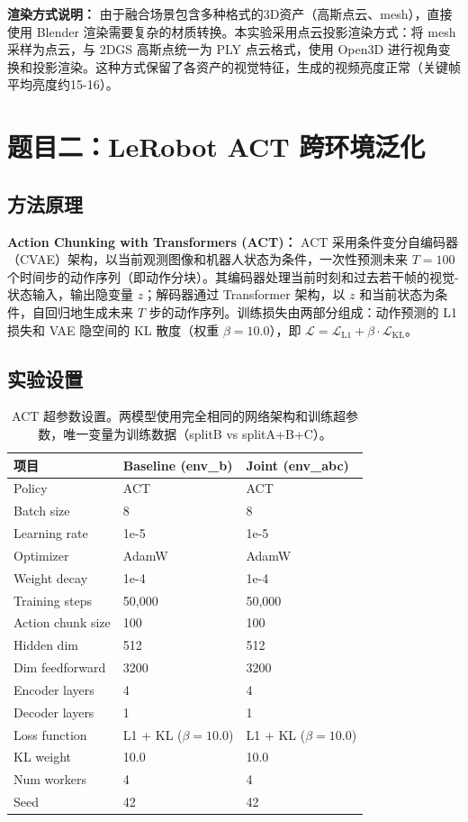 \documentclass[12pt,a4paper,fontset=fandol]{ctexart}
\begin{document}
\textbf{渲染方式说明：} 由于融合场景包含多种格式的3D资产（高斯点云、mesh），直接使用 Blender 渲染需要复杂的材质转换。本实验采用点云投影渲染方式：将 mesh 采样为点云，与 2DGS 高斯点统一为 PLY 点云格式，使用 Open3D 进行视角变换和投影渲染。这种方式保留了各资产的视觉特征，生成的视频亮度正常（关键帧平均亮度约15-16）。

\section{题目二：LeRobot ACT 跨环境泛化}
\subsection{方法原理}

\textbf{Action Chunking with Transformers (ACT)：} ACT 采用条件变分自编码器（CVAE）架构，以当前观测图像和机器人状态为条件，一次性预测未来 $T=100$ 个时间步的动作序列（即动作分块）。其编码器处理当前时刻和过去若干帧的视觉-状态输入，输出隐变量 $z$；解码器通过 Transformer 架构，以 $z$ 和当前状态为条件，自回归地生成未来 $T$ 步的动作序列。训练损失由两部分组成：动作预测的 L1 损失和 VAE 隐空间的 KL 散度（权重 $\beta=10.0$），即 $\mathcal{L} = \mathcal{L}_{\text{L1}} + \beta \cdot \mathcal{L}_{\text{KL}}$。

\subsection{实验设置}

\begin{table}[H]
\centering
\begin{tabular}{lll}
\toprule
项目 & Baseline (env\_b) & Joint (env\_abc) \\
\midrule
Policy & ACT & ACT \\
Batch size & 8 & 8 \\
Learning rate & 1e-5 & 1e-5 \\
Optimizer & AdamW & AdamW \\
Weight decay & 1e-4 & 1e-4 \\
Training steps & 50,000 & 50,000 \\
Action chunk size & 100 & 100 \\
Hidden dim & 512 & 512 \\
Dim feedforward & 3200 & 3200 \\
Encoder layers & 4 & 4 \\
Decoder layers & 1 & 1 \\
Loss function & L1 + KL ($\beta=10.0$) & L1 + KL ($\beta=10.0$) \\
KL weight & 10.0 & 10.0 \\
Num workers & 4 & 4 \\
Seed & 42 & 42 \\
\bottomrule
\end{tabular}
\caption{ACT 超参数设置。两模型使用完全相同的网络架构和训练超参数，唯一变量为训练数据（splitB vs splitA+B+C）。}
\label{tab:hyperparams}
\end{table}
\end{document}
